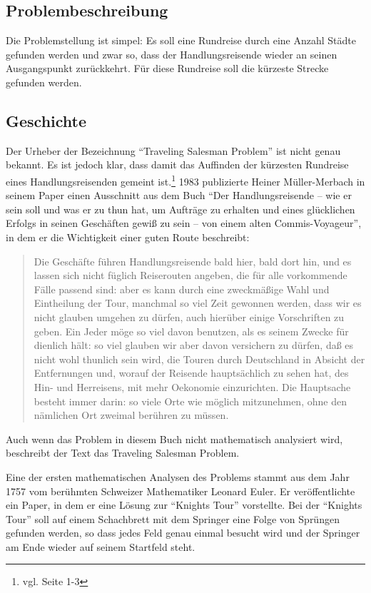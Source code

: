 \documentclass[11pt,a4paper]{article}
\begin{document}
\subsection{Problembeschreibung}
Die Problemstellung ist simpel: Es soll eine Rundreise durch eine Anzahl Städte gefunden werden und zwar so, dass der Handlungsreisende wieder an seinen Ausgangspunkt zurückkehrt. Für diese Rundreise soll die kürzeste Strecke gefunden werden.

\subsection{Geschichte}
Der Urheber der Bezeichnung "`Traveling Salesman Problem"' ist nicht genau bekannt. Es ist jedoch klar, dass damit das Auffinden der kürzesten Rundreise eines Handlungsreisenden gemeint ist.\footnote{vgl. \cite{applegate06} Seite 1-3} 1983 publizierte Heiner Müller-Merbach in seinem Paper\cite{mueller83} einen Ausschnitt aus dem Buch "`Der Handlungsreisende – wie er sein soll und was er zu thun hat, um Aufträge zu erhalten und eines glücklichen Erfolgs in seinen Geschäften gewiß zu sein – von einem alten Commis-Voyageur"', in dem er die Wichtigkeit einer guten Route beschreibt:  
\begin{quotation}
Die Geschäfte führen Handlungsreisende bald hier, bald dort hin, und es lassen sich nicht füglich Reiserouten angeben, die für alle vorkommende Fälle passend sind: aber es kann durch eine zweckmäßige Wahl und Eintheilung der Tour, manchmal so viel Zeit gewonnen werden, dass wir es nicht glauben umgehen zu dürfen, auch hierüber einige Vorschriften zu geben. Ein Jeder möge so viel davon benutzen, als es seinem Zwecke für dienlich hält: so viel glauben wir aber davon versichern zu dürfen, daß es nicht wohl thunlich sein wird, die Touren durch Deutschland in Absicht der Entfernungen und, worauf der Reisende hauptsächlich zu sehen hat, des Hin- und Herreisens, mit mehr Oekonomie einzurichten. Die Hauptsache besteht immer darin: so viele Orte wie möglich mitzunehmen, ohne den nämlichen Ort zweimal berühren zu müssen.
\end{quotation}

Auch wenn das Problem in diesem Buch nicht mathematisch analysiert wird, beschreibt der Text das Traveling Salesman Problem. 

Eine der ersten mathematischen Analysen des Problems stammt aus dem Jahr 1757 vom berühmten Schweizer Mathematiker Leonard Euler. Er veröffentlichte ein Paper, in dem er eine Lösung zur "`Knights Tour"' vorstellte. Bei der "`Knights Tour"' soll auf einem Schachbrett mit dem Springer eine Folge von Sprüngen gefunden werden, so dass jedes Feld genau einmal besucht wird und der Springer am Ende wieder auf seinem Startfeld steht.
\end{document}
